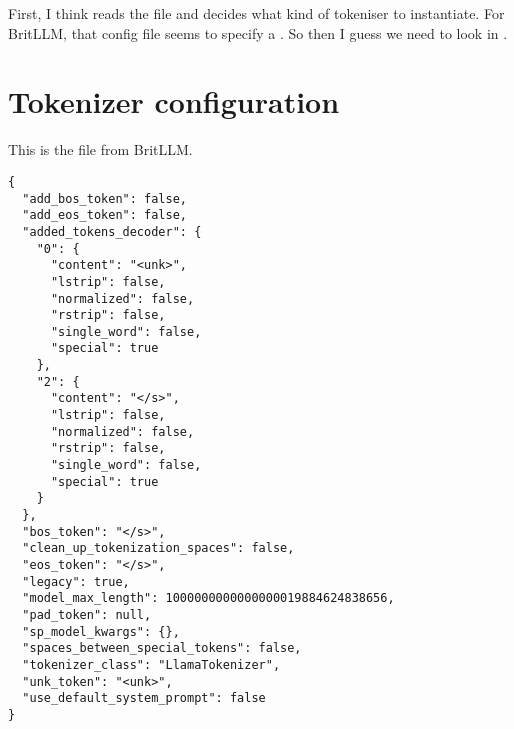 \documentclass[11pt, a4paper]{article}
\begin{document}
First, I think  reads the file
 and decides what kind of tokeniser to
instantiate. For BritLLM, that config file seems to specify a
. So then I guess we need to look in
.








\section{Tokenizer configuration}

This is the file  from BritLLM.
{\small
\begin{verbatim}
{
  "add_bos_token": false,
  "add_eos_token": false,
  "added_tokens_decoder": {
    "0": {
      "content": "<unk>",
      "lstrip": false,
      "normalized": false,
      "rstrip": false,
      "single_word": false,
      "special": true
    },
    "2": {
      "content": "</s>",
      "lstrip": false,
      "normalized": false,
      "rstrip": false,
      "single_word": false,
      "special": true
    }
  },
  "bos_token": "</s>",
  "clean_up_tokenization_spaces": false,
  "eos_token": "</s>",
  "legacy": true,
  "model_max_length": 1000000000000000019884624838656,
  "pad_token": null,
  "sp_model_kwargs": {},
  "spaces_between_special_tokens": false,
  "tokenizer_class": "LlamaTokenizer",
  "unk_token": "<unk>",
  "use_default_system_prompt": false
}
\end{verbatim}}
\end{document}
